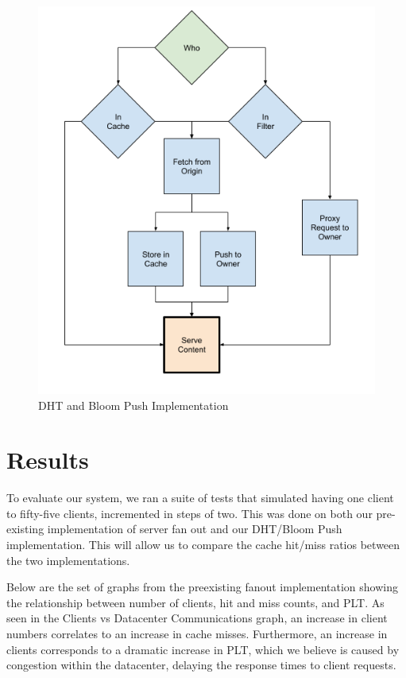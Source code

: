 \documentclass[conference]{IEEEtran}
\begin{document}
\begin{figure}[!h]
	\centering
	\includegraphics[width=0.7\columnwidth]{figures/cache_logic_after.png}
	\caption{DHT and Bloom Push Implementation}
\end{figure}

\section{Results}\label{sec:results}
To evaluate our system, we ran a suite of tests that simulated having one client to fifty-five clients, incremented in steps of two. This was done on both our pre-existing implementation of server fan out and our DHT/Bloom Push implementation.  This will allow us to compare the cache hit/miss ratios between the two implementations.

Below are the set of graphs from the preexisting fanout implementation showing the relationship between number of clients, hit and miss counts, and PLT. As seen in the Clients vs Datacenter Communications graph, an increase in client numbers correlates to an increase in cache misses. Furthermore, an increase in clients corresponds to a dramatic increase in PLT, which we believe is caused by congestion within the datacenter, delaying the response times to client requests. 
\end{document}
